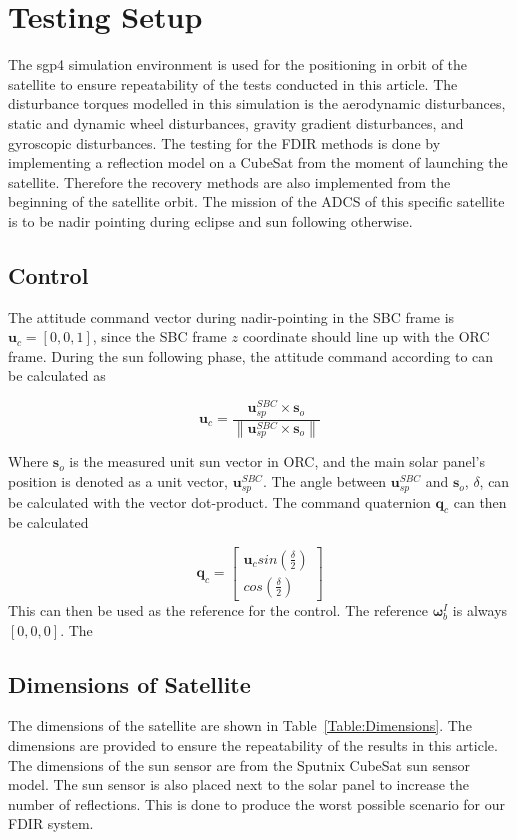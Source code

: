 \documentclass[letterpaper, 10 pt, conference]{ieeeconf}  %
\newcommand\norm[1]{\left\lVert#1\right\rVert}
\begin{document}
\section{Testing Setup}
The sgp4 simulation environment is used for the positioning in orbit of the satellite to ensure repeatability of the tests conducted in this article. The disturbance torques modelled in this simulation is the aerodynamic disturbances, static and dynamic wheel disturbances, gravity gradient disturbances, and gyroscopic disturbances. The testing for the FDIR methods is done by implementing a reflection model on a CubeSat from the moment of launching the satellite. Therefore the recovery methods are also implemented from the beginning of the satellite orbit. The mission of the ADCS of this specific satellite is to be nadir pointing during eclipse and sun following otherwise.

\subsection{Control}
The attitude command vector during nadir-pointing in the SBC frame is $\mathbf{u}_c = [0, 0, 1]$, since the SBC frame $z$ coordinate should line up with the ORC frame. During the sun following phase, the attitude command according to \textcite{chen2000ground} can be calculated as 

\begin{equation}
\mathbf{u}_c = \frac{\mathbf{u}_{sp}^{SBC} \times \mathbf{s}_o}{\norm{\mathbf{u}_{sp}^{SBC} \times \mathbf{s}_o}}
\end{equation}

Where $\mathbf{s}_o$ is the measured unit sun vector in ORC, and the main solar panel's position is denoted as a unit vector, $\mathbf{u}_{sp}^{SBC}$. The angle between $\mathbf{u}_{sp}^{SBC}$ and $\mathbf{s}_o$, $\delta$, can be calculated with the vector dot-product. The command quaternion $\mathbf{q}_c$ can then be calculated

\begin{equation}
\mathbf{q}_c = \begin{bmatrix}
\mathbf{u}_c sin(\frac{\delta}{2}) \\
cos(\frac{\delta}{2})
\end{bmatrix}
\end{equation}
This can then be used as the reference for the control. The reference $\boldsymbol{\omega}_b^I$ is always $[0, 0, 0]$. The 

\subsection{Dimensions of Satellite}
The dimensions of the satellite are shown in Table~\ref{Table:Dimensions}. The dimensions are provided to ensure the repeatability of the results in this article. The dimensions of the sun sensor are from the Sputnix CubeSat sun sensor model. The sun sensor is also placed next to the solar panel to increase the number of reflections. This is done to produce the worst possible scenario for our FDIR system.
\end{document}
